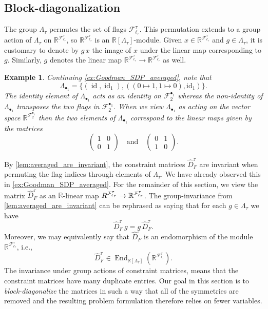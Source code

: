 \documentclass[a4paper,11pt]{article}
\newtheorem{example}[theorem]{Example}
\numberwithin{equation}{section}
\newcommand{\mF}{\mathcal{F}}
\newcommand{\RR}{\mathbb{R}}
\begin{document}
\subsection{Block-diagonalization}\label{sec:block_diagonalization}


    The group $\Lambda_\tau$ permutes the set of flags $\mF^\tau_{\ell_\tau}$. 
    This permutation extends to a group action of $\Lambda_\tau$ on $\RR^{\mF^\tau_{\ell_\tau}}$, so $\RR^{\mF^\tau_{\ell_\tau}}$ is an $\mathbb R[\Lambda_\tau]$-module. Given $x\in \RR^{\mF^\tau_{\ell_\tau}}$ and $g\in \Lambda_\tau$, it is customary to denote by $g \, x$ the image of $x$ under the linear map corresponding to $g$. Similarly, $g$ denotes the linear map $\RR^{\mF^\tau_{\ell_\tau}}\to \RR^{\mF^\tau_{\ell_\tau}}$ as well.

    \begin{example}\label{ex:group_action}
        Continuing \cref{ex:Goodman_SDP_averaged}, note that 
        \[
            \Lambda_{\bullet_1} = \{(\operatorname{id},\operatorname{id}_1), ((0\mapsto1,1\mapsto0),\operatorname{{id}_1}) \}.
        \]
        The identity element of $\Lambda_{\bullet_1}$ acts as an identity on $\mF^{\bullet_1}_{2}$ whereas the non-identity of $\Lambda_{\bullet_1}$ transposes the two flags in $\mF^{\bullet_1}_{2}$. When we view $\Lambda_{\bullet_1}$ as acting on the vector space $\mathbb R^{\mF_2^{\bullet_1}}$ then the two elements of $\Lambda_{\bullet_1}$ correspond to the linear maps given by the matrices
        \[
            \begin{pmatrix}
                1 & 0 \\ 0 & 1
            \end{pmatrix}
            \quad \text{and} \quad
            \begin{pmatrix}
                0 & 1 \\ 1 & 0
            \end{pmatrix}.
        \]
    \end{example}
    
    By \cref{lem:averaged_are_invariant}, the constraint matrices $\hat D^\tau_F$ are invariant when permuting the flag indices through elements of $\Lambda_\tau$. We have already observed this in \cref{ex:Goodman_SDP_averaged}.
    For the remainder of this section, we view the matrix $\hat D^\tau_F$ as an $\mathbb R$-linear map $\mathbb \RR^{\mF^\tau_{\ell_\tau}} \to \RR^{\mF^\tau_{\ell_\tau}}$. The group-invariance from \cref{lem:averaged_are_invariant} can be rephrased as saying that for each $g\in \Lambda_\tau$ we have 
    \[
        \hat D^\tau_F \, g = g \, \hat D^\tau_F.
    \]
    Moreover, we may equivalently say that $\hat D_F^\tau$ is an endomorphism of the module $\RR^{\mF^\tau_{\ell_\tau}}$, i.e.,
    \[
        \hat D^\tau_F \in \operatorname{End}_{\mathbb R[\Lambda_\tau]}(\RR^{\mF^\tau_{\ell_\tau}}).
    \]
The invariance under group actions of constraint matrices, means that the constraint matrices have many duplicate entries. Our goal in this section is to \emph{block-diagonalize} the matrices in such a way that all of the symmetries are removed and the resulting problem formulation therefore relies on fewer variables.
\end{document}
